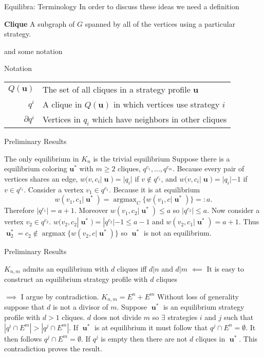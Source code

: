 \documentclass{beamer}
\DeclareMathOperator*{\argmax}{\text{argmax}}
\DeclareMathOperator{\uu}{\mathbf{u}}
\begin{document}
\begin{frame}
	{Equilibra: Terminology} %
	In order to discuss these ideas we need a definition
	\begin{block}{\textbf{Clique}}
		A subgraph of $G$ spanned by all of the vertices using a particular strategy. 
	\end{block}  
	and some notation
	\begin{block}{Notation}
		\begin{tabular}{rp{9cm}} 
			$Q(\mathbf{u})$& The set of all cliques in a strategy profile $\mathbf{u}$ \\
			$q^i$& A clique in $Q(\mathbf{u})$ in which vertices use strategy $i$\\
			$\partial q^i$& Vertices in $q_i$ which have neighbors in other cliques\\
		\end{tabular}
	\end{block}
\end{frame} 	
\begin{frame}{Preliminary Results}
	\begin{block}{The only equilibrium in $K_n$ is the trivial equilibrium}
		Suppose there is a equilibrium coloring $\mathbf{u^*}$ with $m\geq2$ cliques, $q^{c_1},...,q^{c_m}$. Because every pair of vertices shares an edge, $w(v,c_i|\uu)=|q_i|$ if $v\notin q^{c_i}$, and $w(v,c_i|\uu)=|q_i|-1$ if $v\in q^{c_i}$.  Consider a vertex $v_1\in q^{c_1}$. Because it is at equilibrium $$w(v_1,c_1|\uu^*)=\argmax_C\{w(v_1,c|\uu^*)\}=:a.$$
		Therefore $|q^{c_1}|=a+1$. Moreover $w(v_1,c_2|\uu^*)\leq a$ so $|q^{c_2}|\leq a$.
		Now consider a vertex  $v_2\in q^{c_2}$. $w(v_2,c_2|\uu^*)=|q^{c_2}|-1\leq a-1$ and $w(v_2,c_1|\uu^*)=a+1$. 
		Thus $\uu^*_2=c_2\notin \argmax\{w(v_2,c|\uu^*)\}$ so $\uu^*$ is not an equilibrium.  
	\end{block}
\end{frame}

\begin{frame}{Preliminary Results}
	\begin{block}{$K_{n,m}$ admits an equilibrium with $d$ cliques iff $d|n$ and $d|m$}
		$\impliedby$ It is easy to construct an equilibrium strategy profile with $d$ cliques
		
		$\implies$ I argue by contradiction. $K_{n,m}=E^n+E^m$  Without loss of generality suppose that $d$ is not a divisor of $m$. Suppose $\uu^*$ is an equilibrium strategy profile with $d>1$ cliques. $d$ does not divide $m$ so $\exists$ strategies $i$ and $j$ such that $|q^i\cap E^m|>|q^j\cap E^m|$. If $\uu^*$ is at equilibrium it must follow that $q^j\cap E^n=\emptyset$. It then follows $q^j\cap E^m =\emptyset$. If $q^j$ is empty then there are not $d$ cliques in $\uu^*$. This contradiction proves the result.   
	\end{block}
\end{frame}
\end{document}
